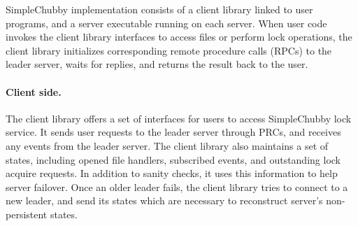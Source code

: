 %

SimpleChubby implementation consists of a client library linked to user programs,
and a server executable running on each server.
When user code invokes the client library interfaces to access files or perform lock operations,
the client library initializes corresponding remote procedure calls (RPCs) to the leader server,
waits for replies, and returns the result back to the user.

\paragraph{Client side.}
The client library offers a set of interfaces for users to access SimpleChubby
lock service. It sends user requests to the leader server through PRCs,
and receives any events from the leader server.
The client library also maintains a set of states, including opened file handlers,
subscribed events, and outstanding lock acquire requests.
In addition to sanity checks, it uses this information to help server failover.
Once an older leader fails, the client library tries to connect to a new leader,
and send its states which are necessary to reconstruct server's non-persistent
states.


